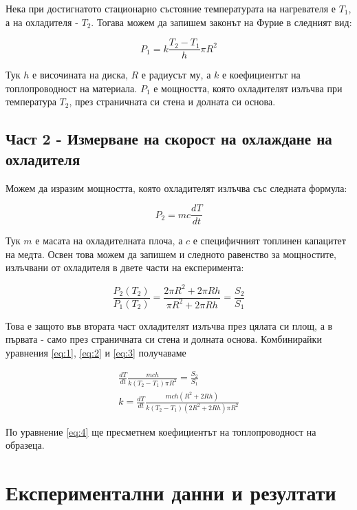 \documentclass[reprint,amsmath,amssymb,aps]{revtex4-2}
\begin{document}
Нека при достигнатото стационарно състояние температурата на нагревателя е $T_1$, а на охладителя - $T_2$. Тогава можем да запишем законът на Фурие в следният вид:

\begin{equation*} \label{eq:1}
    P_1 = k\frac{T_2 - T_1}{h} \pi R^2 \tag{1}
\end{equation*}

Тук $h$ е височината на диска, $R$ е радиусът му, а $k$ е коефициентът на топлопроводност на материала. $P_1$ е мощността, която охладителят излъчва при температура $T_2$, през страничната си стена и долната си основа.

\subsection{Част 2 - Измерване на скорост на охлаждане на охладителя}

Можем да изразим мощността, която охладителят излъчва със следната формула: 

\begin{equation*} \label{eq:2}
    P_2 = m c \frac{dT}{dt} \tag{2}
\end{equation*}

Тук $m$ е масата на охладителната плоча, а $c$ е специфичният топлинен капацитет на медта. Освен това можем да запишем и следното равенство за мощностите, излъчвани от охладителя в двете части на експеримента: 

\begin{equation*} \label{eq:3}
    \frac{P_2(T_2)}{P_1(T_2)} = \frac{2\pi R^2 + 2\pi Rh}{\pi R^2 + 2\pi Rh} = \frac{S_2}{S_1} \tag{3}
\end{equation*}

Това е защото във втората част охладителят излъчва през цялата си площ, а в първата - само през страничната си стена и долната основа. Комбинирайки уравнения \eqref{eq:1}, \eqref{eq:2} и \eqref{eq:3} получаваме 

\begin{align*}
    \frac{dT}{dt} \frac{mc h}{k (T_2 - T_1) \pi R^2} = \frac{S_2}{S_1} \\
    k = \frac{dT}{dt} \frac{mc h ( R^2 + 2 Rh)}{k (T_2 - T_1) (2 R^2 + 2 Rh) \pi R^2} \label{eq:4} \tag{4}
\end{align*}

По уравнение \eqref{eq:4} ще пресметнем коефициентът на топлопроводност на образеца. 

\section{Експериментални данни и резултати}
\end{document}
